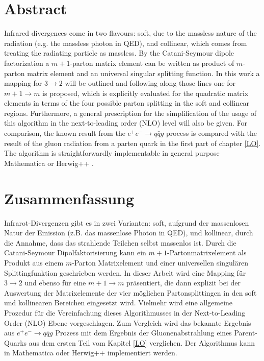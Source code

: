 \thispagestyle{empty}
\section*{\Large \bfseries \centering Abstract}
\vspace{1cm}
Infrared divergences come in two flavours: soft, due to the  massless  nature  of  the  radiation  (e.g.  the  massless photon in QED), and collinear, which comes from treating the radiating particle as massless.
By the Catani-Seymour dipole factorization a $m+1$-parton matrix element can be written as product of $m$-parton matrix element and an universal singular splitting function.  
In this work a mapping for $ 3\rightarrow 2 $ will be outlined and following along those lines one for $ m+1\rightarrow m $ is proposed, which is explicitly evaluated for the quadratic matrix elements in terms of the four possible parton splitting in the soft and collinear regions. Furthermore, a general prescription for the simplification of the usage of this algorithm in the next-to-leading order (NLO) level will also be given.  For comparison, the known result from the $ e^{+}e^{-} \rightarrow q \bar{q} g $ process is compared with the result of the gluon radiation from a parten quark in the first part of chapter \ref{LO}. 
The algorithm is straightforwardly implementable in general purpose \textup{Mathematica} or \textup{Herwig++} \cite{Bahr:2008pv}.

\vspace{3cm}
\section*{\Large \bfseries \centering Zusammenfassung}
\vspace{1cm}
Infrarot-Divergenzen gibt es in zwei Varianten: soft, aufgrund der massenlosen Natur der Emission (z.B. das massenlose Photon in QED), und kollinear, durch die Annahme, dass das strahlende Teilchen selbst massenlos ist.
Durch die Catani-Seymour Dipolfaktorisierung kann ein $m+1$-Partonmatrixelement als Produkt aus einem $m$-Parton Matrixelement und einer universellen singul\"aren Splittingfunktion geschrieben werden.  
In dieser Arbeit wird eine Mapping für $ 3\rightarrow 2 $ und ebenso f\"ur eine $ m+1\rightarrow m $ pr\"asentiert, die dann explizit bei der Auswertung der Matrixelemente der vier möglichen Partonsplittingen in den soft und kollinearen Bereichen eingesetzt wird. Vielmehr wird eine allgemeine Prozedur für die Vereinfachung dieses Algorithmusses in der Next-to-Leading Order (NLO) Ebene vorgeschlagen.  Zum Vergleich wird das bekannte Ergebnis aus $ e^{+}e^{-} \rightarrow q \bar{q} g $ Prozess mit dem Ergebnis der Gluonenabstrahlung eines Parent-Quarks aus dem ersten Teil vom Kapitel \ref{LO} verglichen. 
Der Algorithmus kann in \textup{Mathematica} oder \textup{Herwig++} \cite{Bahr:2008pv} implementiert werden.